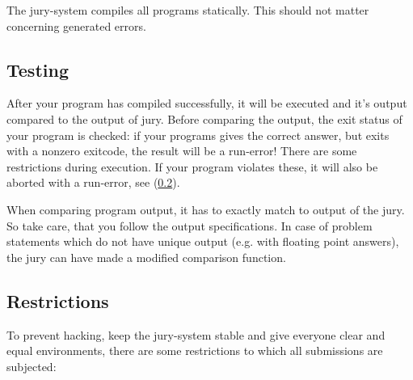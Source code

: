 The jury-system compiles all programs statically. This should not
matter concerning generated errors.

\subsection{Testing}

After your program has compiled successfully, it will be executed and
it's output compared to the output of jury. Before comparing the
output, the exit status of your program is checked: if your programs
gives the correct answer, but exits with a nonzero exitcode, the
result will be a run-error! There are some restrictions during
execution. If your program violates these, it will also be aborted
with a run-error, see (\ref{runlimits}).

When comparing program output, it has to exactly match to output of
the jury. So take care, that you follow the output specifications. In
case of problem statements which do not have unique output (e.g. with
floating point answers), the jury can have made a modified comparison
function.

\subsection{Restrictions}\label{runlimits}

To prevent hacking, keep the jury-system stable and give everyone
clear and equal environments, there are some restrictions to which all
submissions are subjected:

